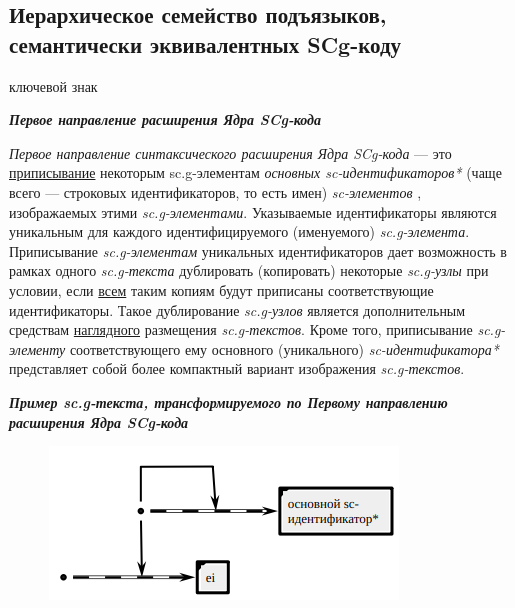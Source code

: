 \subsection{Иерархическое семейство подъязыков, семантически эквивалентных SCg-коду}
\label{sec_scg_extensions}

\begin{SCn}
\begin{scnrelfromlist}{ключевой знак}
\end{scnrelfromlist}
\end{SCn}

\textbf{\textit{Первое направление расширения Ядра SCg-кода}}

\textit{Первое направление синтаксического расширения Ядра SCg-кода} --- это \uline{приписывание} некоторым \mbox{sc.g-элементам} \textit{основных sc-идентификаторов*} (чаще всего --- строковых идентификаторов, то есть имен) \textit{sc-элементов} , изображаемых этими \textit{sc.g-элементами}. Указываемые идентификаторы являются уникальным для каждого идентифицируемого (именуемого) \textit{sc.g-элемента}. Приписывание \textit{sc.g-элементам} уникальных идентификаторов дает возможность в рамках одного \textit{sc.g-текста} дублировать (копировать) некоторые \textit{sc.g-узлы} при условии, если \uline{всем} таким копиям будут приписаны соответствующие идентификаторы. Такое дублирование \textit{sc.g-узлов} является дополнительным средствам \uline{наглядного} размещения \textit{sc.g-текстов}. Кроме того, приписывание \textit{sc.g-элементу} соответствующего ему основного (уникального) \textit{sc-идентификатора*} представляет собой более компактный вариант изображения \textit{sc.g-текстов}.

\textbf{\textit{Пример sc.g-текста, трансформируемого по Первому направлению расширения Ядра SCg-кода}}

\begin{figure}[h]
	\centering
	\includegraphics[scale=0.8]{images/intro/scg/scg_transf1.png}
\end{figure}

